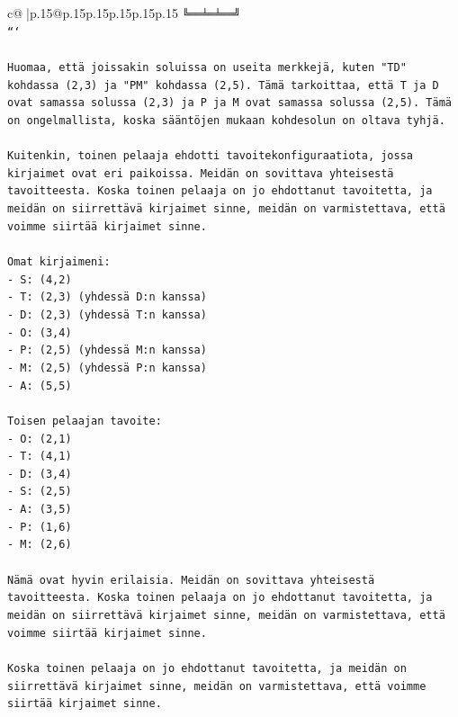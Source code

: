 \documentclass{article}
\begin{document}
{\begin{supertabular}{c@{$\;$}|p{.15\linewidth}@{}p{.15\linewidth}p{.15\linewidth}p{.15\linewidth}p{.15\linewidth}p{.15\linewidth}}
{{{\texttt{╚══╧═╧══╝} \\
\texttt{```} \\
\\ 
\texttt{Huomaa, että joissakin soluissa on useita merkkejä, kuten "TD" kohdassa (2,3) ja "PM" kohdassa (2,5). Tämä tarkoittaa, että T ja D ovat samassa solussa (2,3) ja P ja M ovat samassa solussa (2,5). Tämä on ongelmallista, koska sääntöjen mukaan kohdesolun on oltava tyhjä.} \\
\\ 
\texttt{Kuitenkin, toinen pelaaja ehdotti tavoitekonfiguraatiota, jossa kirjaimet ovat eri paikoissa. Meidän on sovittava yhteisestä tavoitteesta. Koska toinen pelaaja on jo ehdottanut tavoitetta, ja meidän on siirrettävä kirjaimet sinne, meidän on varmistettava, että voimme siirtää kirjaimet sinne.} \\
\\ 
\texttt{Omat kirjaimeni:} \\
\texttt{{-} S: (4,2)} \\
\texttt{{-} T: (2,3) (yhdessä D:n kanssa)} \\
\texttt{{-} D: (2,3) (yhdessä T:n kanssa)} \\
\texttt{{-} O: (3,4)} \\
\texttt{{-} P: (2,5) (yhdessä M:n kanssa)} \\
\texttt{{-} M: (2,5) (yhdessä P:n kanssa)} \\
\texttt{{-} A: (5,5)} \\
\\ 
\texttt{Toisen pelaajan tavoite:} \\
\texttt{{-} O: (2,1)} \\
\texttt{{-} T: (4,1)} \\
\texttt{{-} D: (3,4)} \\
\texttt{{-} S: (2,5)} \\
\texttt{{-} A: (3,5)} \\
\texttt{{-} P: (1,6)} \\
\texttt{{-} M: (2,6)} \\
\\ 
\texttt{Nämä ovat hyvin erilaisia. Meidän on sovittava yhteisestä tavoitteesta. Koska toinen pelaaja on jo ehdottanut tavoitetta, ja meidän on siirrettävä kirjaimet sinne, meidän on varmistettava, että voimme siirtää kirjaimet sinne.} \\
\\ 
\texttt{Koska toinen pelaaja on jo ehdottanut tavoitetta, ja meidän on siirrettävä kirjaimet sinne, meidän on varmistettava, että voimme siirtää kirjaimet sinne.} \\
}}}
\end{supertabular}}
\end{document}
